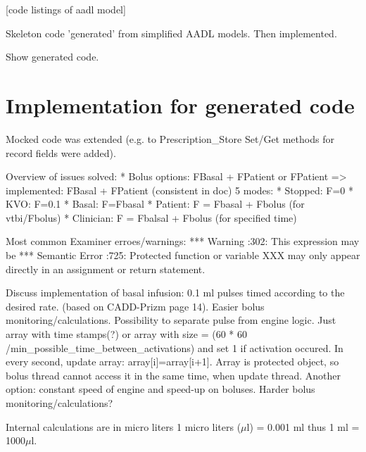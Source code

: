 [code listings of aadl model]


Skeleton code 'generated' from simplified AADL models. Then implemented.

Show generated code.



\section{Implementation for generated code}

Mocked code was extended (e.g. to Prescription\_Store Set/Get methods for record fields were added).

Overview of issues solved: 
* Bolus options: FBasal + FPatient or FPatient => implemented: FBasal + FPatient (consistent in doc)
5 modes:
* Stopped: F=0
* KVO: F=0.1
* Basal: F=Fbasal
* Patient: F = Fbasal + Fbolus (for vtbi/Fbolus)
* Clinician: F = Fbalsal + Fbolus (for specified time)

Most common Examiner\cite{Examiner:Online} erroes/warnings:
***        Warning                     :302: This expression may be
***        Semantic Error              :725: Protected function or variable XXX may only appear directly in an assignment or return statement.

Discuss implementation of basal infusion: 0.1 ml pulses timed according to the desired rate. (based on CADD-Prizm page 14). Easier bolus monitoring/calculations. Possibility to separate pulse from engine logic. Just array with time stamps(?) or array with size = (60 * 60 /min\_possible\_time\_between\_activations) and set 1 if activation occured. In every second, update array: array[i]=array[i+1]. Array is protected object, so bolus thread cannot access it in the same time, when update thread.
Another option: constant speed of engine and speed-up on boluses. Harder bolus monitoring/calculations?


Internal calculations are in micro liters 1 micro liters ($\mu$l) = 0.001 ml thus 1 ml = 1000$\mu$l.


